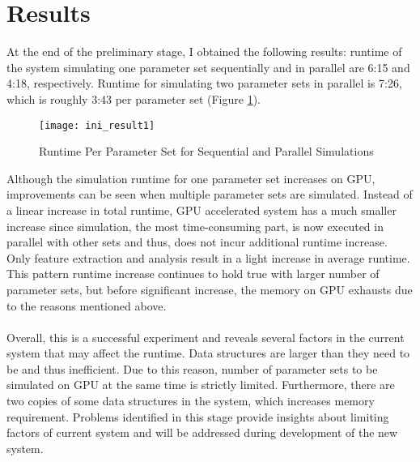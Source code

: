 \documentclass[../thesis.tex]{subfiles}
\begin{document}
\section{Results}
At the end of the preliminary stage, I obtained the following results: runtime of the system simulating one parameter set sequentially and in parallel are 6:15 and 4:18, respectively. Runtime for simulating two parameter sets in parallel is 7:26, which is roughly 3:43 per parameter set (Figure \ref{fig:result1}). 
\begin{figure}[h]
\centering
\texttt{[image: ini\_result1]}
\caption{Runtime Per Parameter Set for Sequential and Parallel Simulations}
\label{fig:result1}
\end{figure}
Although the simulation runtime for one parameter set increases on GPU, improvements can be seen when multiple parameter sets are simulated. Instead of a linear increase in total runtime, GPU accelerated system has a much smaller increase since simulation, the most time-consuming part, is now executed in parallel with other sets and thus, does not incur additional runtime increase. Only feature extraction and analysis result in a light increase in average runtime. This pattern runtime increase continues to hold true with larger number of parameter sets, but before significant increase, the memory on GPU exhausts due to the reasons mentioned above.\\
\\
Overall, this is a successful experiment and reveals several factors in the current system that may affect the runtime. Data structures are larger than they need to be and thus inefficient. Due to this reason, number of parameter sets to be simulated on GPU at the same time is strictly limited. Furthermore, there are two copies of some data structures in the system, which increases memory requirement. Problems identified in this stage provide insights about limiting factors of current system and will be addressed during development of the new system. 
\end{document}

